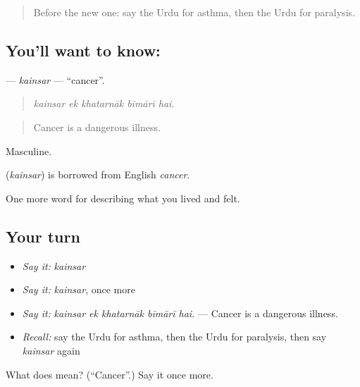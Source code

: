\begin{quote}
Before the new one: say the Urdu for asthma, then the Urdu for paralysis.
\end{quote}

\subsection*{You'll want to know: }
\textbf{} — \emph{kainsar} — \textquotedblleft{}cancer\textquotedblright{}.

\begin{quote}
    
\end{quote}

\begin{quote}
\emph{kainsar ek khatarnāk bīmārī hai.}
\end{quote}

\begin{quote}
Cancer is a dangerous illness.
\end{quote}

Masculine.

\begin{cousinweb}
\textbf{} (\emph{kainsar}) is borrowed from English \emph{cancer}.
\end{cousinweb}

\begin{grammarlens}[title={What you've built}]
One more word for describing what you lived and felt.
\end{grammarlens}

\subsection*{Your turn}
\begin{itemize}
\raggedright
  \item \emph{Say it:} \emph{kainsar}
  \item \emph{Say it:} \emph{kainsar}, once more
  \item \emph{Say it:} \emph{kainsar ek khatarnāk bīmārī hai.} — Cancer is a dangerous illness.
  \item \emph{Recall:} say the Urdu for asthma, then the Urdu for paralysis, then say \emph{kainsar} again
\end{itemize}

\begin{tcolorbox}[breakable,colback=teal!4,colframe=teal!35!black,title={Before you move on}]
What does  mean? (\textquotedblleft{}Cancer\textquotedblright{}.) Say it once more.
\end{tcolorbox}
